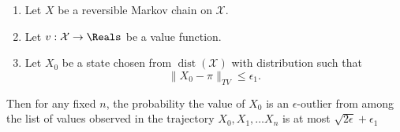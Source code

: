 \documentclass[12pt]{article}
\begin{document}
\begin{corollary}
    \begin{enumerate}
        \item
            Let \( X \) be a reversible Markov chain on \( \mathcal{X} \).
        \item
            Let \( v :  \mathcal{X} \to \Reals \) be a value function.
        \item
            Let \( X_0 \) be a state chosen from \(
            \operatorname{dist}
            (\mathcal{X}) \) with distribution such that
            \[
                \| X_0 - \pi \|_{TV} \le \epsilon_1.
            \]
    \end{enumerate}
    Then for any fixed \( n \), the probability the value of \( X_0 \)
    is an \( \epsilon \)-outlier from among the list of values observed
    in the trajectory \( X_0, X_1, \dots X_n \) is at most \( \sqrt{2\epsilon}
    + \epsilon_1 \)
\end{corollary}
\end{document}

